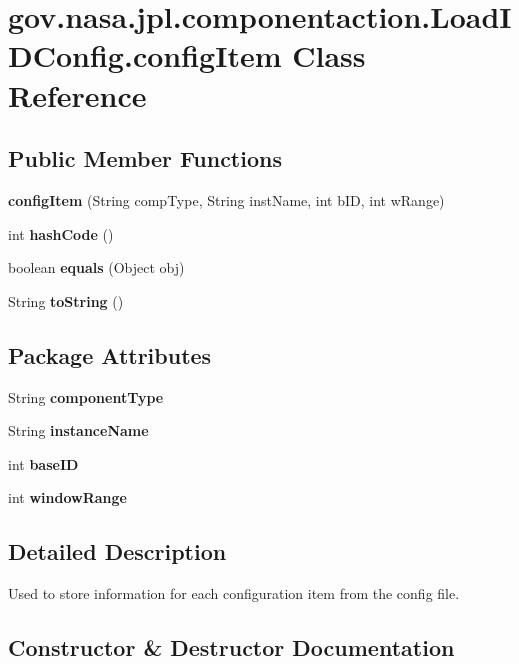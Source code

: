 \section{gov.\+nasa.\+jpl.\+componentaction.\+Load\+I\+D\+Config.\+config\+Item Class Reference}
\label{classgov_1_1nasa_1_1jpl_1_1componentaction_1_1_load_i_d_config_1_1config_item}
\subsection*{Public Member Functions}
\begin{DoxyCompactItemize}
\item 
{\bf config\+Item} (String comp\+Type, String inst\+Name, int b\+ID, int w\+Range)
\item 
int {\bf hash\+Code} ()
\item 
boolean {\bf equals} (Object obj)
\item 
String {\bf to\+String} ()
\end{DoxyCompactItemize}
\subsection*{Package Attributes}
\begin{DoxyCompactItemize}
\item 
String {\bf component\+Type}
\item 
String {\bf instance\+Name}
\item 
int {\bf base\+ID}
\item 
int {\bf window\+Range}
\end{DoxyCompactItemize}


\subsection{Detailed Description}
Used to store information for each configuration item from the config file. 

\subsection{Constructor \& Destructor Documentation}
